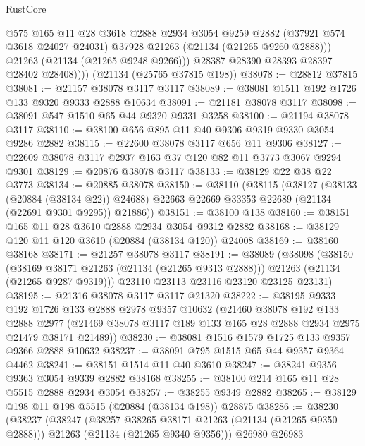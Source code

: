 \begin{lexlean}{RustCore}
\begin{coremodule}
                @575
                @165
                @11
                @28
                @3618
                @2888
                @2934
                @3054
                @9259
                @2882
                (@37921 @574 @3618 @24027 @24031)
                @37928
                @21263
                (@21134 (@21265 @9260 @2888)))
              @21263
              (@21134 (@21265 @9248 @9266)))
            @28387
            @28390
            @28393
            @28397
            @28402
            @28408))))
    (@21134 (@25765 @37815 @198))
@38078 := @28812 @37815
@38081 := @21157 @38078 @3117 @3117
@38089 := @38081 @1511 @192 @1726 @133 @9320 @9333 @2888 @10634
@38091 := @21181 @38078 @3117
@38098 := @38091 @547 @1510 @65 @44 @9320 @9331 @3258
@38100 := @21194 @38078 @3117
@38110 := @38100 @656 @895 @11 @40 @9306 @9319 @9330 @3054 @9286 @2882
@38115 := @22600 @38078 @3117 @656 @11 @9306
@38127 := @22609 @38078 @3117 @2937 @163 @37 @120 @82 @11 @3773 @3067 @9294 @9301
@38129 := @20876 @38078 @3117
@38133 := @38129 @22 @38 @22 @3773
@38134 := @20885 @38078
@38150 := @38110
    (@38115
      (@38127
        (@38133 (@20884 (@38134 @22)) @24688)
        @22663
        @22669
        @33353
        @22689
        (@21134 (@22691 @9301 @9295))
        @21886))
@38151 := @38100 @138
@38160 := @38151 @165 @11 @28 @3610 @2888 @2934 @3054 @9312 @2882
@38168 := @38129 @120 @11 @120 @3610 (@20884 (@38134 @120)) @24008
@38169 := @38160 @38168
@38171 := @21257 @38078 @3117
@38191 := @38089
    (@38098
      (@38150
        (@38169 @38171 @21263 (@21134 (@21265 @9313 @2888)))
        @21263
        (@21134 (@21265 @9287 @9319)))
      @23110
      @23113
      @23116
      @23120
      @23125
      @23131)
@38195 := @21316 @38078 @3117 @3117 @21320
@38222 := @38195
    @9333
    @192
    @1726
    @133
    @2888
    @2978
    @9357
    @10632
    (@21460
      @38078
      @192
      @133
      @2888
      @2977
      (@21469 @38078 @3117 @189 @133 @165 @28 @2888 @2934 @2975 @21479 @38171 @21489))
@38230 := @38081 @1516 @1579 @1725 @133 @9357 @9366 @2888 @10632
@38237 := @38091 @795 @1515 @65 @44 @9357 @9364 @4462
@38241 := @38151 @1514 @11 @40 @3610
@38247 := @38241 @9356 @9363 @3054 @9339 @2882 @38168
@38255 := @38100 @214 @165 @11 @28 @5515 @2888 @2934 @3054
@38257 := @38255 @9349 @2882
@38265 := @38129 @198 @11 @198 @5515 (@20884 (@38134 @198)) @28875
@38286 := @38230
    (@38237
      (@38247
        (@38257 @38265 @38171 @21263 (@21134 (@21265 @9350 @2888)))
        @21263
        (@21134 (@21265 @9340 @9356)))
      @26980
      @26983

\end{coremodule}
\end{lexlean}
